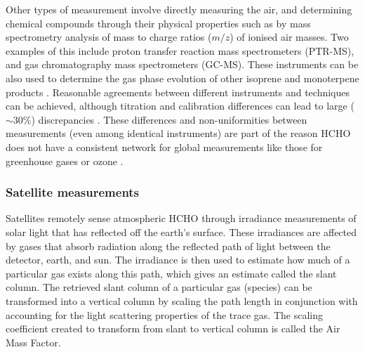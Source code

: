     
    Other types of measurement involve directly measuring the air, and determining chemical compounds through their physical properties such as by mass spectrometry analysis of mass to charge ratios ($m/z$) of ionised air masses.
    Two examples of this include proton transfer reaction mass spectrometers (PTR-MS), and gas chromatography mass spectrometers (GC-MS).
    These instruments can be also used to determine the gas phase evolution of 
    other isoprene and monoterpene products 
    \parencite[e.g.,][]{Lee2006a, Nguyen2014, Wolfe2016, Lerner2017}.
    Reasonable agreements between different instruments and techniques can be 
    achieved, although titration and calibration differences can lead to large 
    ($\sim 30\%$) discrepancies \parencite[e.g.,][]{Hak2005}.
    These differences and non-uniformities between measurements (even among identical instruments) are part of the reason HCHO does not have a consistent network for global measurements like those for greenhouse gases or ozone \parencite{FortemsCheiney2012}.
  
    \subsubsection{Satellite measurements}
      \label{LR:HCHO:Sat}
      
      Satellites remotely sense atmospheric HCHO through irradiance measurements of solar light that has reflected off the earth's surface. 
      These irradiances are affected by gases that absorb radiation along the reflected path of light between the detector, earth, and sun. 
      The irradiance is then used to estimate how much of a particular gas exists along this path, which gives an estimate called the slant column.
      The retrieved slant column of a particular gas (species) can be transformed into a vertical column by scaling the path length in conjunction with accounting for the light scattering properties of the trace gas.
      The scaling coefficient created to transform from slant to vertical column is called the Air Mass Factor.
      
